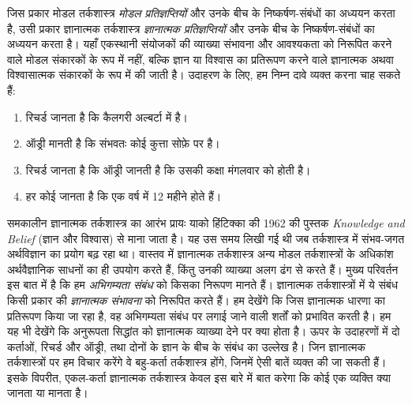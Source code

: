 \documentclass[../../../include/open-logic-section]{subfiles}
\begin{document}


जिस प्रकार मोडल तर्कशास्त्र \emph{मोडल प्रतिज्ञप्तियों} और उनके बीच के
निष्कर्षण-संबंधों का अध्ययन करता है, उसी प्रकार ज्ञानात्मक तर्कशास्त्र
\emph{ज्ञानात्मक प्रतिज्ञप्तियों} और उनके बीच के निष्कर्षण-संबंधों का अध्ययन
करता है। यहाँ एकस्थानी संयोजकों की व्याख्या संभावना और आवश्यकता को निरूपित
करने वाले मोडल संकारकों के रूप में नहीं, बल्कि ज्ञान या विश्वास का प्रतिरूपण
करने वाले ज्ञानात्मक अथवा विश्वासात्मक संकारकों के रूप में की जाती है।
उदाहरण के लिए, हम निम्न दावे व्यक्त करना चाह सकते हैं:

\begin{enumerate}
\item रिचर्ड जानता है कि कैलगरी अल्बर्टा में है।
\item ऑड्री मानती है कि संभवतः कोई कुत्ता सोफ़े पर है।
\item रिचर्ड जानता है कि ऑड्री जानती है कि उसकी कक्षा मंगलवार को होती है।
\item हर कोई जानता है कि एक वर्ष में 12 महीने होते हैं।
\end{enumerate}
समकालीन ज्ञानात्मक तर्कशास्त्र का आरंभ प्रायः याको हिंटिक्का की 1962 की
पुस्तक \emph{Knowledge and Belief} (ज्ञान और विश्वास) से माना जाता है। यह
उस समय लिखी गई थी जब तर्कशास्त्र में संभव-जगत अर्थविज्ञान का प्रयोग बढ़ रहा
था। वास्तव में ज्ञानात्मक तर्कशास्त्र अन्य मोडल तर्कशास्त्रों के अधिकांश
अर्थवैज्ञानिक साधनों का ही उपयोग करते हैं, किंतु उनकी व्याख्या अलग ढंग से
करते हैं। मुख्य परिवर्तन इस बात में है कि हम \emph{अभिगम्यता संबंध} को किसका
निरूपण मानते हैं। ज्ञानात्मक तर्कशास्त्रों में ये संबंध किसी प्रकार की
\emph{ज्ञानात्मक संभावना} को निरूपित करते हैं। हम देखेंगे कि जिस ज्ञानात्मक
धारणा का प्रतिरूपण किया जा रहा है, वह अभिगम्यता संबंध पर लगाई जाने वाली
शर्तों को प्रभावित करती है। हम यह भी देखेंगे कि अनुरूपता सिद्धांत को
ज्ञानात्मक व्याख्या देने पर क्या होता है। ऊपर के उदाहरणों में दो कर्ताओं,
रिचर्ड और ऑड्री, तथा दोनों के ज्ञान के बीच के संबंध का उल्लेख है। जिन
ज्ञानात्मक तर्कशास्त्रों पर हम विचार करेंगे वे बहु-कर्ता तर्कशास्त्र होंगे,
जिनमें ऐसी बातें व्यक्त की जा सकती हैं। इसके विपरीत, एकल-कर्ता ज्ञानात्मक
तर्कशास्त्र केवल इस बारे में बात करेगा कि कोई एक व्यक्ति क्या जानता या
मानता है।
\end{document}
